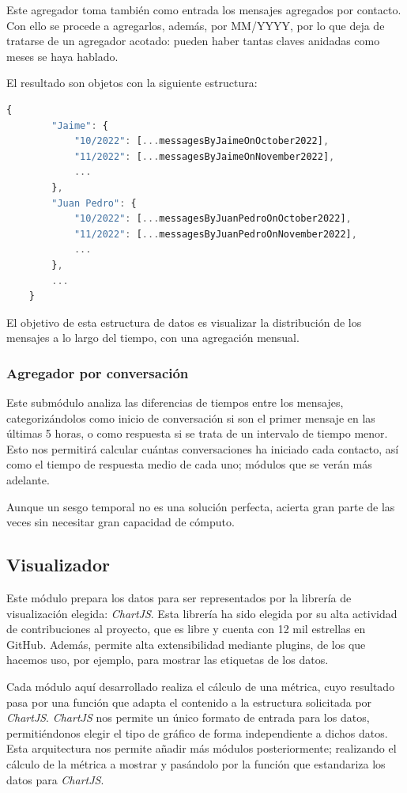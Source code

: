 Este agregador toma también como entrada los mensajes agregados por contacto. Con ello se procede a agregarlos, además, por MM/YYYY, por lo que deja de tratarse de un agregador acotado: pueden haber tantas claves anidadas como meses se haya hablado.

El resultado son objetos con la siguiente estructura:

\begin{lstlisting}[language=JavaScript]
	{
		"Jaime": {
			"10/2022": [...messagesByJaimeOnOctober2022],
			"11/2022": [...messagesByJaimeOnNovember2022],
			...
		},
		"Juan Pedro": {
			"10/2022": [...messagesByJuanPedroOnOctober2022],
			"11/2022": [...messagesByJuanPedroOnNovember2022],
			...
		},
		...
	}
\end{lstlisting}

El objetivo de esta estructura de datos es visualizar la distribución de los mensajes a lo largo del tiempo, con una agregación mensual.

\subsubsection{Agregador por conversación}

Este submódulo analiza las diferencias de tiempos entre los mensajes, categorizándolos como inicio de conversación si son el primer mensaje en las últimas 5 horas, o como respuesta si se trata de un intervalo de tiempo menor. Esto nos permitirá calcular cuántas conversaciones ha iniciado cada contacto, así como el tiempo de respuesta medio de cada uno; módulos que se verán más adelante.

Aunque un sesgo temporal no es una solución perfecta, acierta gran parte de las veces sin necesitar gran capacidad de cómputo.

\subsection{Visualizador}

Este módulo prepara los datos para ser representados por la librería de visualización elegida: \textit{ChartJS}.  Esta librería ha sido elegida por su alta actividad de contribuciones al proyecto, que es libre y cuenta con 12 mil estrellas en GitHub. Además, permite alta extensibilidad mediante plugins, de los que hacemos uso, por ejemplo, para mostrar las etiquetas de los datos.

Cada módulo aquí desarrollado realiza el cálculo de una métrica, cuyo resultado pasa por una función que adapta el contenido a la estructura solicitada por \textit{ChartJS}. \textit{ChartJS} nos permite un único formato de entrada para los datos, permitiéndonos elegir el tipo de gráfico de forma independiente a dichos datos. Esta arquitectura nos permite añadir más módulos posteriormente; realizando el cálculo de la métrica a mostrar y pasándolo por la función que estandariza los datos para \textit{ChartJS}.

